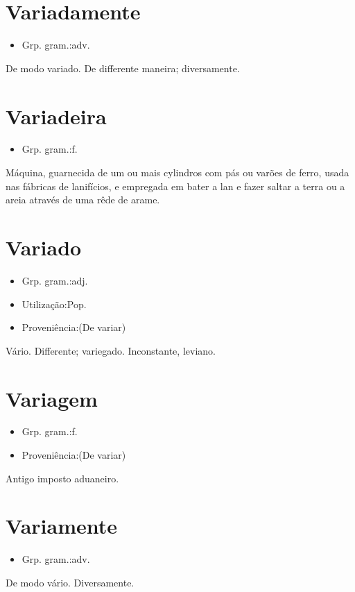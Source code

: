 \documentclass{article}
\begin{document}
\section{Variadamente}
\begin{itemize}
\item {Grp. gram.:adv.}
\end{itemize}
De modo variado.
De differente maneira; diversamente.
\section{Variadeira}
\begin{itemize}
\item {Grp. gram.:f.}
\end{itemize}
Máquina, guarnecida de um ou mais cylindros com pás ou varões de ferro, usada nas fábricas de lanifícios, e empregada em bater a lan e fazer saltar a terra ou a areia através de uma rêde de arame.
\section{Variado}
\begin{itemize}
\item {Grp. gram.:adj.}
\end{itemize}
\begin{itemize}
\item {Utilização:Pop.}
\end{itemize}
\begin{itemize}
\item {Proveniência:(De \textunderscore variar\textunderscore )}
\end{itemize}
Vário.
Differente; variegado.
Inconstante, leviano.
\section{Variagem}
\begin{itemize}
\item {Grp. gram.:f.}
\end{itemize}
\begin{itemize}
\item {Proveniência:(De \textunderscore variar\textunderscore )}
\end{itemize}
Antigo imposto aduaneiro.
\section{Variamente}
\begin{itemize}
\item {Grp. gram.:adv.}
\end{itemize}
De modo vário.
Diversamente.
\end{document}
